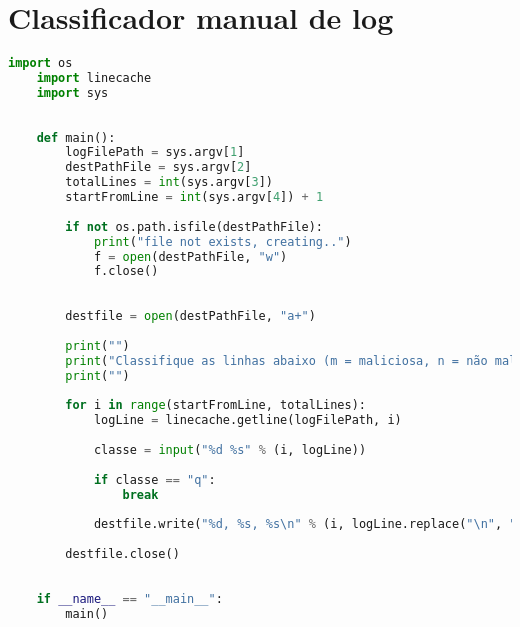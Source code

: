 
\chapter{Classificador manual de log}
\label{ap:log_classifier}


\begin{lstlisting}[language=Python]
    import os
    import linecache
    import sys
    
    
    def main():
        logFilePath = sys.argv[1]
        destPathFile = sys.argv[2]
        totalLines = int(sys.argv[3])
        startFromLine = int(sys.argv[4]) + 1
    
        if not os.path.isfile(destPathFile):
            print("file not exists, creating..")
            f = open(destPathFile, "w")
            f.close()
            
    
        destfile = open(destPathFile, "a+")
    
        print("")
        print("Classifique as linhas abaixo (m = maliciosa, n = não maliciosa), q para sair")
        print("")
    
        for i in range(startFromLine, totalLines):
            logLine = linecache.getline(logFilePath, i)
            
            classe = input("%d %s" % (i, logLine))
    
            if classe == "q":
                break
    
            destfile.write("%d, %s, %s\n" % (i, logLine.replace("\n", ""), classe) )
    
        destfile.close()
        
    
    if __name__ == "__main__":
        main()
\end{lstlisting}